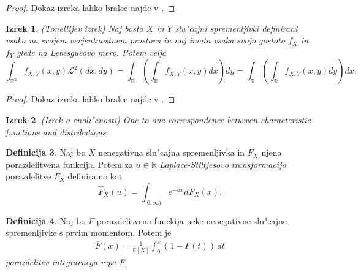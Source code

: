 \documentclass[12pt, a4paper, reqno]{amsart}
\theoremstyle{definition}
\newtheorem{definicija}{Definicija}[section]
\theoremstyle{plain}
\newtheorem{izrek}[definicija]{Izrek}
\newcommand{\R}{\mathbb{R}}
\newcommand{\1}{\mathds{1}}
\begin{document}
    \begin{proof}
        Dokaz izreka lahko bralec najde v \cite{7}.
    \end{proof}

    \begin{izrek}(Tonellijev izrek)
        Naj bosta $X$ in $Y$ slu"cajni spremenljivki definirani vsaka na svojem verjentnostnem prostoru
        in naj imata vsaka svojo gostoto $f_X$ in $f_Y$ glede na Lebesgueovo mero.
        Potem velja
        \begin{equation*}
            \int_{\R^2}f_{X, Y}(x, y)\mathcal{L}^2(dx, dy) 
            = \int_{\R}\left(\int_{\R}f_{X, Y}(x, y)dx\right)dy = \int_{\R}\left(\int_{\R}f_{X, Y}(x, y)dy\right)dx.
        \end{equation*}
        \label{izr:TonellijevIzrek}
    \end{izrek}

    \begin{proof}
        Dokaz izreka lahko bralec najde v \cite{7}.
    \end{proof} 

    \begin{izrek}(Izrek o enoli"cnosti)
        One to one correspondence betwwen characteristic functions and distributions.
    \end{izrek}

    \begin{definicija}
        Naj bo $X$ nenegativna slu"cajna spremenljivka in $F_X$ njena porazdelitvena funkcija. 
        Potem za $u\in\R$ \textit{Laplace-Stiltjesovo transformacijo} porazdelitve $F_X$ definiramo kot
        \begin{equation*}
            \hat{F}_X(u) = \int_{[0, \infty)}e^{-ux}dF_X(x).
        \end{equation*}
        \label{def:LaplaceStiltjesovaTransformacija}
    \end{definicija}

    \begin{definicija}
        Naj bo $F$ porazdelitvena funckija neke nenegativne slu"cajne spremenljivke s prvim 
        momentom. Potem je 
        \begin{align*}
            \overline{F}(x) = \frac{1}{\mathbb{E}[X]} \int_0^x (1 - F(t)) \, dt
        \end{align*}
        \textit{porazdelitev integrarnega repa F}.
        \label{def:porazdelitevintegriranegaRepa}
    \end{definicija}
\end{document}
